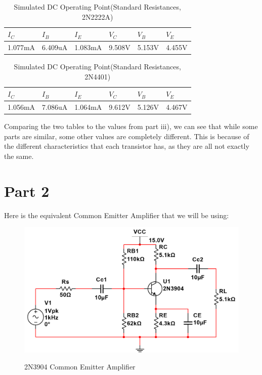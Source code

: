 \documentclass[12pt]{article}
\begin{document}
\begin{table}[h!]
\centering
\begin{tabular}{|l|l|l|l|l|l|}
\cline{1-6}
$I_C$      & $I_B$      & $I_E$      & $V_C$     & $V_B$     & $V_E$     \\ \cline{1-6}
\hline
1.077mA & 6.409uA & 1.083mA & 9.508V & 5.153V & 4.455V \\ 
\hline
\end{tabular}
\caption{Simulated DC Operating Point(Standard Resistances, 2N2222A)}
\label{table:DC Standard Operating Values(2N2222A)}
\end{table}

\begin{table}[h!]
\centering
\begin{tabular}{|l|l|l|l|l|l|}
\cline{1-6}
$I_C$      & $I_B$      & $I_E$      & $V_C$     & $V_B$     & $V_E$     \\ \cline{1-6}
\hline
1.056mA & 7.086uA & 1.064mA & 9.612V & 5.126V & 4.467V \\ 
\hline
\end{tabular}
\caption{Simulated DC Operating Point(Standard Resistances, 2N4401)}
\label{table:DC Standard Operating Values(2N4401)}
\end{table}
\FloatBarrier
Comparing the two tables to the values from part iii), we can see that while some parts are similar, some other values are completely different. This is because of the different characteristics that each transistor has, as they are all not exactly the same.

\section{Part 2}
Here is the equivalent Common Emitter Amplifier that we will be using:

\begin{figure}[H]
\centering
\includegraphics[height=0.30\textwidth]{Images/2acircuit.png}\\
\caption{2N3904 Common Emitter Amplifier}
\label{fig:part2a_circuit}
\end{figure}
\end{document}
